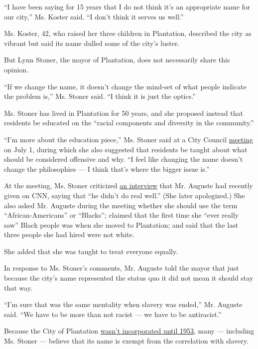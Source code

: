 ``I have been saying for 15 years that I do not think it's an
appropriate name for our city,'' Ms. Koster said. ``I don't think it
serves us well.''

Ms. Koster, 42, who raised her three children in Plantation, described
the city as vibrant but said its name dulled some of the city's luster.

But Lynn Stoner, the mayor of Plantation, does not necessarily share
this opinion.

``If we change the name, it doesn't change the mind-set of what people
indicate the problem is,'' Ms. Stoner said. ``I think it is just the
optics.''

Ms. Stoner has lived in Plantation for 50 years, and she proposed
instead that residents be educated on the ``racial components and
diversity in the community.''

``I'm more about the education piece,'' Ms. Stoner said at a City
Council
\href{http://plantation.granicus.com/player/clip/575?view_id=2}{meeting}
on July 1, during which she also suggested that residents be taught
about what should be considered offensive and why. ``I feel like
changing the name doesn't change the philosophies --- I think that's
where the bigger issue is.''

At the meeting, Ms. Stoner criticized
\href{https://www.facebook.com/DharylAuguste/videos/10220288815443473}{an
interview} that Mr. Auguste had recently given on CNN, saying that ``he
didn't do real well.'' (She later apologized.) She also asked Mr.
Auguste during the meeting whether she should use the term
``African-Americans'' or ``Blacks''; claimed that the first time she
``ever really saw'' Black people was when she moved to Plantation; and
said that the last three people she had hired were not white.

She added that she was taught to treat everyone equally.

In response to Ms. Stoner's comments, Mr. Auguste told the mayor that
just because the city's name represented the status quo it did not mean
it should stay that way.

``I'm sure that was the same mentality when slavery was ended,'' Mr.
Auguste said. ``We have to be more than not racist --- we have to be
antiracist.''

Because the City of Plantation
\href{http://www.plantation.org/Plantation/history.html}{wasn't
incorporated until 1953}, many --- including Ms. Stoner --- believe that
its name is exempt from the correlation with slavery.

